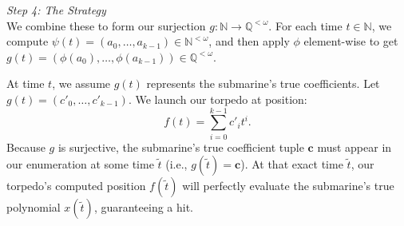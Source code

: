 \begin{solution}
    \textit{Step 4: The Strategy} \\
    We combine these to form our surjection \( g: \mathbb{N} \to \mathbb{Q}^{<\omega} \). For each time \( t \in \mathbb{N} \), we compute \( \psi\left(t\right) = \left(a_0, \dots, a_{k-1}\right) \in \mathbb{N}^{<\omega} \), and then apply \( \phi \) element-wise to get \( g\left(t\right) = \left(\phi\left(a_0\right), \dots, \phi\left(a_{k-1}\right)\right) \in \mathbb{Q}^{<\omega} \).

    At time \( t \), we assume \( g\left(t\right) \) represents the submarine's true coefficients. Let \( g\left(t\right) = \left(c'_0, \dots, c'_{k-1}\right) \). We launch our torpedo at position:
    \[
        f\left(t\right) = \sum_{i=0}^{k-1} c'_i t^{i}.
    \]
    Because \( g \) is surjective, the submarine's true coefficient tuple \( \mathbf{c} \) must appear in our enumeration at some time \( \tilde{t} \) (i.e., \( g\left(\tilde{t}\right) = \mathbf{c} \)). At that exact time \( \tilde{t} \), our torpedo's computed position \( f\left(\tilde{t}\right) \) will perfectly evaluate the submarine's true polynomial \( x\left(\tilde{t}\right) \), guaranteeing a hit.
\end{solution}

